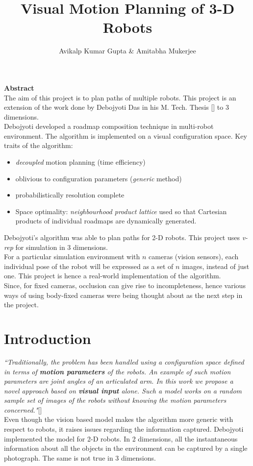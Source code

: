 \documentclass[12pt]{article}
\title{Visual Motion Planning of 3-D Robots}
\author{ Avikalp Kumar Gupta \& Amitabha Mukerjee}
\begin{document}
\maketitle
 
\textbf{\large{Abstract}}\vspace{0.4em}\\
The aim of this project is to plan paths of multiple robots. This project is an extension of the work done by Debojyoti Das in his M. Tech. Thesis [\cite{deb}] to 3 dimensions.\\
Debojyoti developed a roadmap composition technique in multi-robot environment. The algorithm is implemented on a visual configuration space. Key traits of the algorithm:
\begin{itemize}
  \setlength\itemsep{0em}
  \item \textit{decoupled} motion planning (time efficiency)
  \item oblivious to configuration parameters (\textit{generic} method)
  \item probabilistically resolution complete
  \item Space optimality: \textit{neighbourhood product lattice} used so that Cartesian products of individual roadmaps are dynamically generated.
\end{itemize}
Debojyoti's algorithm was able to plan paths for 2-D robots. This project uses \textit{v-rep} for simulation in 3 dimensions.\\
For a particular simulation environment with $n$ cameras (vision sensors), each individual pose of the robot will be expressed as a set of $n$ images, instead of just one. This project is hence a real-world implementation of the algorithm.\\
Since, for fixed cameras, occlusion can give rise to incompleteness, hence various ways of using body-fixed cameras were being thought about as the next step in the project.

\section{Introduction}
\textit{``Traditionally, the problem has been handled using a configuration space defined in terms of \textbf{motion parameters} of the robots. An example of such motion parameters are joint angles of an articulated arm. In this work we propose a novel approach based on \textbf{visual input} alone. Such a model works on a random sample set of images of the robots without knowing the motion parameters concerned."}[\cite{deb}]\\
Even though the vision based model makes the algorithm more generic with respect to robots, it raises issues regarding the information captured. Debojyoti implemented the model for 2-D robots. In 2 dimensions, all the instantaneous information about all the objects in the environment can be captured by a single photograph. The same is not true in 3 dimensions. 
\end{document}
